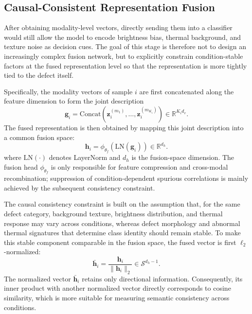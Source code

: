\documentclass[journal]{IEEEtran}
\begin{document}
\subsection{Causal-Consistent Representation Fusion}

After obtaining modality-level vectors, directly sending them into a classifier would still allow the model to encode brightness bias, thermal background, and texture noise as decision cues. The goal of this stage is therefore not to design an increasingly complex fusion network, but to explicitly constrain condition-stable factors at the fused representation level so that the representation is more tightly tied to the defect itself.

Specifically, the modality vectors of sample $i$ are first concatenated along the feature dimension to form the joint description
\begin{equation}
\mathbf{g}_i = \mathrm{Concat}\!\left(\mathbf{z}_i^{(m_1)}, \dots, \mathbf{z}_i^{(m_{K_i})}\right) \in \mathbb{R}^{K_i d_v}.
\label{eq:concat}
\end{equation}
The fused representation is then obtained by mapping this joint description into a common fusion space:
\begin{equation}
\mathbf{h}_i = \phi_{\theta_f}\!\left(\mathrm{LN}(\mathbf{g}_i)\right) \in \mathbb{R}^{d_h}.
\label{eq:fusion}
\end{equation}
where $\mathrm{LN}(\cdot)$ denotes LayerNorm and $d_h$ is the fusion-space dimension. The fusion head $\phi_{\theta_f}$ is only responsible for feature compression and cross-modal recombination; suppression of condition-dependent spurious correlations is mainly achieved by the subsequent consistency constraint.

The causal consistency constraint is built on the assumption that, for the same defect category, background texture, brightness distribution, and thermal response may vary across conditions, whereas defect morphology and abnormal thermal signatures that determine class identity should remain stable. To make this stable component comparable in the fusion space, the fused vector is first $\ell_2$-normalized:
\begin{equation}
\bar{\mathbf{h}}_i = \frac{\mathbf{h}_i}{\|\mathbf{h}_i\|_2} \in \mathcal{S}^{d_h-1}.
\label{eq:norm}
\end{equation}
The normalized vector $\bar{\mathbf{h}}_i$ retains only directional information. Consequently, its inner product with another normalized vector directly corresponds to cosine similarity, which is more suitable for measuring semantic consistency across conditions.
\end{document}
